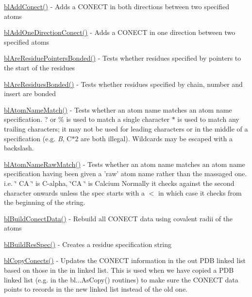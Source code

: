\begin{DoxyItemize}
\item \hyperlink{_build_conect_8c_a6830d532b565e142a67b45032253076b}{bl\-Add\-Conect()} -\/ Adds a C\-O\-N\-E\-C\-T in both directions between two specified atoms
\item \hyperlink{_build_conect_8c_a648e43949ef1add4b7436652134cec43}{bl\-Add\-One\-Direction\-Conect()} -\/ Adds a C\-O\-N\-E\-C\-T in one direction between two specified atoms
\item \hyperlink{_build_conect_8c_a45bfcd436408cda8fed0292f729fc0a8}{bl\-Are\-Residue\-Pointers\-Bonded()} -\/ Tests whether residues specified by pointers to the start of the residues
\item \hyperlink{_build_conect_8c_a83cca08fa117ae88809bb7c30d2a79a2}{bl\-Are\-Residues\-Bonded()} -\/ Tests whether residues specified by chain, number and insert are bonded
\item \hyperlink{_atom_name_match_8c_ad77422fc2b983565a6a18f7637b90ccb}{bl\-Atom\-Name\-Match()} -\/ Tests whether an atom name matches an atom name specification. ? or \% is used to match a single character $\ast$ is used to match any trailing characters; it may not be used for leading characters or in the middle of a specification (e.\-g. {\itshape B}, C$\ast$2 are both illegal). Wildcards may be escaped with a backslash.
\item \hyperlink{_atom_name_match_8c_ad421ee2a06f5464d432a05ca77f3816e}{bl\-Atom\-Name\-Raw\-Match()} -\/ Tests whether an atom name matches an atom name specification having been given a 'raw' atom name rather than the massaged one. i.\-e. \char`\"{} C\-A \char`\"{} is C-\/alpha, \char`\"{}\-C\-A  \char`\"{} is Calcium Normally it checks against the second character onwards unless the spec starts with a $<$ in which case it checks from the beginning of the string.
\item \hyperlink{_build_conect_8c_a644691ff7319bbf54367489a9e91661b}{bl\-Build\-Conect\-Data()} -\/ Rebuild all C\-O\-N\-E\-C\-T data using covalent radii of the atoms
\item \hyperlink{_parse_res_8c_affffca92bfb08dff092d96c87cc12d61}{bl\-Build\-Res\-Spec()} -\/ Creates a residue specification string
\item \hyperlink{_build_conect_8c_ad267806fc8e84f90103c1a4034bf3fc1}{bl\-Copy\-Conects()} -\/ Updates the C\-O\-N\-E\-C\-T information in the out P\-D\-B linked list based on those in the in linked list. This is used when we have copied a P\-D\-B linked list (e.\-g. in the bl...As\-Copy() routines) to make sure the C\-O\-N\-E\-C\-T data points to records in the new linked list instead of the old one.

\end{DoxyItemize}
